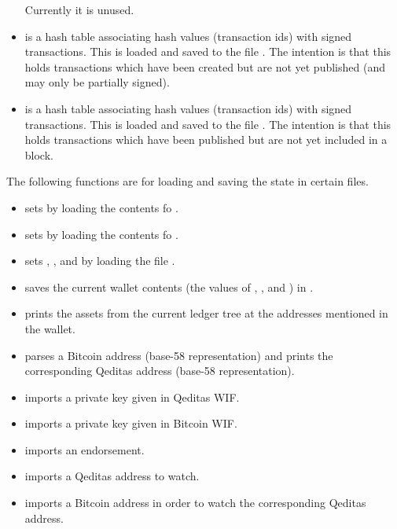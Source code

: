 \begin{itemize}
Currently it is unused.
\item {} is a hash table associating hash values (transaction ids)
with signed transactions. This is loaded and saved to the file {}.
The intention is that this holds transactions which have been created but
are not yet published (and may only be partially signed).
\item {} is a hash table associating hash values (transaction ids)
with signed transactions. This is loaded and saved to the file {}.
The intention is that this holds transactions which have been published
but are not yet included in a block.
\end{itemize}

The following functions are for loading and saving the state in certain files.
\begin{itemize} %
\item {} sets {} by loading the contents fo {}.
\item {} sets {} by loading the contents fo {}.
\item {} sets {}, {},
{}
and {}
by loading the file {}.
\item {} saves the current wallet contents
(the values of {}, {},
{}
and {})
in {}.
\item {} prints the assets from the current ledger tree at the addresses
mentioned in the wallet.
\item {} parses a Bitcoin address (base-58 representation) and prints the corresponding Qeditas address (base-58 representation).
\item {} imports a private key given in Qeditas WIF.
\item {} imports a private key given in Bitcoin WIF.
\item {} imports an endorsement.
\item {} imports a Qeditas address to watch.
\item {} imports a Bitcoin address in order to watch the corresponding Qeditas address.
\end{itemize}

